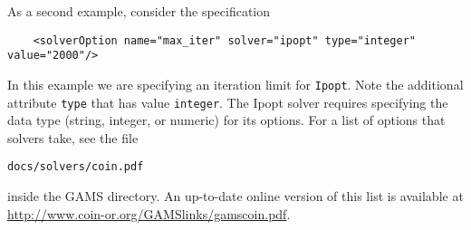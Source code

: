 As a second example, consider the specification
\begin{verbatim}
    <solverOption name="max_iter" solver="ipopt" type="integer" value="2000"/> 
\end{verbatim}
In this example we are specifying an iteration limit for {\tt Ipopt}.  Note the additional attribute 
{\tt type} that has value  {\tt integer}. The Ipopt solver requires specifying the data type 
(string, integer, or numeric) for its options.   For a list of options that solvers take, 
see the file
\begin{verbatim}
docs/solvers/coin.pdf
\end{verbatim}
inside the GAMS directory. 
An up-to-date online version of this list is available at \url{http://www.coin-or.org/GAMSlinks/gamscoin.pdf}.

\fi

\label{section:gamssummary}


